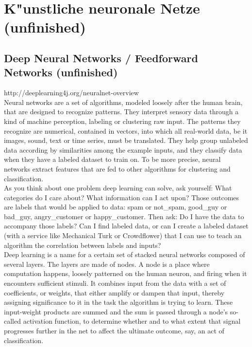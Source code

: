 \chapter{K"unstliche neuronale Netze (unfinished)}
{
\section{Deep Neural Networks / Feedforward Networks (unfinished)}
http://deeplearning4j.org/neuralnet-overview\\
Neural networks are a set of algorithms, modeled loosely after the human brain, that are designed to recognize patterns. They interpret sensory data through a kind of machine perception, labeling or clustering raw input. The patterns they recognize are numerical, contained in vectors, into which all real-world data, be it images, sound, text or time series, must be translated.
They help group unlabeled data according by similarities among the example inputs, and they classify data when they have a labeled dataset to train on. To be more precise, neural networks extract features that are fed to other algorithms for clustering and classification.\\
As you think about one problem deep learning can solve, ask yourself: What categories do I care about? What information can I act upon? Those outcomes are labels that would be applied to data: spam or not\_spam, good\_guy or bad\_guy, angry\_customer or happy\_customer. Then ask: Do I have the data to accompany those labels? Can I find labeled data, or can I create a labeled dataset (with a service like Mechanical Turk or Crowdflower) that I can use to teach an algorithm the correlation between labels and inputs?\\
Deep learning is a name for a certain set of stacked neural networks composed of several layers. The layers are made of nodes. A node is a place where computation happens, loosely patterned on the human neuron, and firing when it encounters sufficient stimuli. It combines input from the data with a set of coefficients, or weights, that either amplify or dampen that input, thereby assigning significance to it in the task the algorithm is trying to learn. These input-weight products are summed and the sum is passed through a node’s so-called activation function, to determine whether and to what extent that signal progresses further in the net to affect the ultimate outcome, say, an act of classification.\\

}
